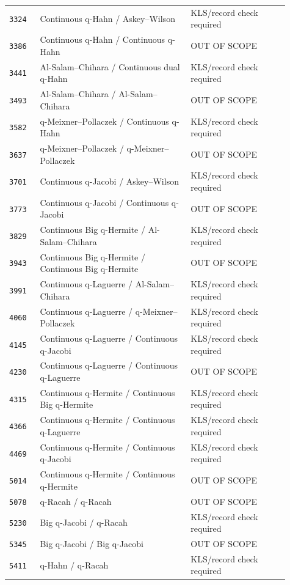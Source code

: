 \documentclass[11pt]{article}
\begin{document}
\begin{longtable}{@{}p{0.10\linewidth}p{0.49\linewidth}p{0.32\linewidth}@{}}
\texttt{3324} & Continuous q-Hahn / Askey--Wilson & KLS/record check required \\
\texttt{3386} & Continuous q-Hahn / Continuous q-Hahn & OUT OF SCOPE \\
\texttt{3441} & Al-Salam--Chihara / Continuous dual q-Hahn & KLS/record check required \\
\texttt{3493} & Al-Salam--Chihara / Al-Salam--Chihara & OUT OF SCOPE \\
\texttt{3582} & q-Meixner--Pollaczek / Continuous q-Hahn & KLS/record check required \\
\texttt{3637} & q-Meixner--Pollaczek / q-Meixner--Pollaczek & OUT OF SCOPE \\
\texttt{3701} & Continuous q-Jacobi / Askey--Wilson & KLS/record check required \\
\texttt{3773} & Continuous q-Jacobi / Continuous q-Jacobi & OUT OF SCOPE \\
\texttt{3829} & Continuous Big q-Hermite / Al-Salam--Chihara & KLS/record check required \\
\texttt{3943} & Continuous Big q-Hermite / Continuous Big q-Hermite & OUT OF SCOPE \\
\texttt{3991} & Continuous q-Laguerre / Al-Salam--Chihara & KLS/record check required \\
\texttt{4060} & Continuous q-Laguerre / q-Meixner--Pollaczek & KLS/record check required \\
\texttt{4145} & Continuous q-Laguerre / Continuous q-Jacobi & KLS/record check required \\
\texttt{4230} & Continuous q-Laguerre / Continuous q-Laguerre & OUT OF SCOPE \\
\texttt{4315} & Continuous q-Hermite / Continuous Big q-Hermite & KLS/record check required \\
\texttt{4366} & Continuous q-Hermite / Continuous q-Laguerre & KLS/record check required \\
\texttt{4469} & Continuous q-Hermite / Continuous q-Jacobi & KLS/record check required \\
\texttt{5014} & Continuous q-Hermite / Continuous q-Hermite & OUT OF SCOPE \\
\texttt{5078} & q-Racah / q-Racah & OUT OF SCOPE \\
\texttt{5230} & Big q-Jacobi / q-Racah & KLS/record check required \\
\texttt{5345} & Big q-Jacobi / Big q-Jacobi & OUT OF SCOPE \\
\texttt{5411} & q-Hahn / q-Racah & KLS/record check required \\

\end{longtable}
\end{document}

